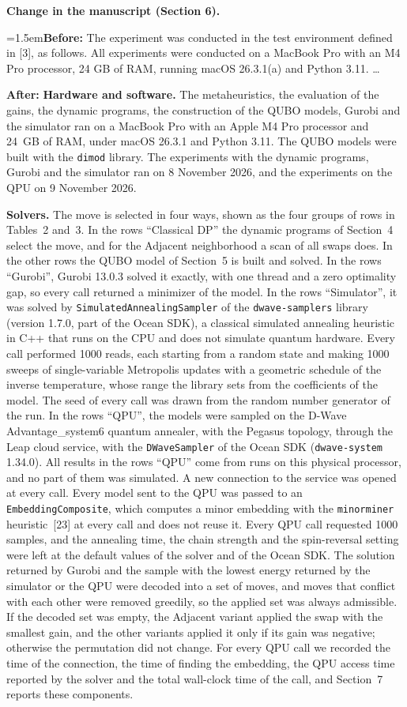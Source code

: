 \documentclass[12pt]{article}
\newcommand{\change}[3]{\par\smallskip\noindent\textbf{Change in the manuscript (#1).}\par
  {\leftskip=1.5em\noindent\textbf{Before:} #2\par\noindent\textbf{After:} #3\par}}
\begin{document}
\change{Section 6}{The experiment was conducted in the test environment defined in [3], as follows. All experiments were conducted on a MacBook Pro with an M4 Pro processor, 24 GB of RAM, running macOS 26.3.1(a) and Python 3.11. \dots}{\textbf{Hardware and software.} The metaheuristics, the evaluation of the gains, the dynamic programs, the construction of the QUBO models, Gurobi and the simulator ran on a MacBook Pro with an Apple M4 Pro processor and 24~GB of RAM, under macOS 26.3.1 and Python 3.11. The QUBO models were built with the \texttt{dimod} library. The experiments with the dynamic programs, Gurobi and the simulator ran on 8 November 2026, and the experiments on the QPU on 9 November 2026.

\textbf{Solvers.} The move is selected in four ways, shown as the four groups of rows in Tables~2 and~3. In the rows ``Classical DP'' the dynamic programs of Section~4 select the move, and for the Adjacent neighborhood a scan of all swaps does. In the other rows the QUBO model of Section~5 is built and solved. In the rows ``Gurobi'', Gurobi 13.0.3 solved it exactly, with one thread and a zero optimality gap, so every call returned a minimizer of the model. In the rows ``Simulator'', it was solved by \texttt{SimulatedAnnealingSampler} of the \texttt{dwave-samplers} library (version 1.7.0, part of the Ocean SDK), a classical simulated annealing heuristic in C++ that runs on the CPU and does not simulate quantum hardware. Every call performed 1000 reads, each starting from a random state and making 1000 sweeps of single-variable Metropolis updates with a geometric schedule of the inverse temperature, whose range the library sets from the coefficients of the model. The seed of every call was drawn from the random number generator of the run. In the rows ``QPU'', the models were sampled on the D-Wave Advantage\_system6 quantum annealer, with the Pegasus topology, through the Leap cloud service, with the \texttt{DWaveSampler} of the Ocean SDK (\texttt{dwave-system} 1.34.0). All results in the rows ``QPU'' come from runs on this physical processor, and no part of them was simulated. A new connection to the service was opened at every call. Every model sent to the QPU was passed to an \texttt{EmbeddingComposite}, which computes a minor embedding with the \texttt{minorminer} heuristic~[23] at every call and does not reuse it. Every QPU call requested 1000 samples, and the annealing time, the chain strength and the spin-reversal setting were left at the default values of the solver and of the Ocean SDK. The solution returned by Gurobi and the sample with the lowest energy returned by the simulator or the QPU were decoded into a set of moves, and moves that conflict with each other were removed greedily, so the applied set was always admissible. If the decoded set was empty, the Adjacent variant applied the swap with the smallest gain, and the other variants applied it only if its gain was negative; otherwise the permutation did not change. For every QPU call we recorded the time of the connection, the time of finding the embedding, the QPU access time reported by the solver and the total wall-clock time of the call, and Section~7 reports these components.

}
\end{document}
